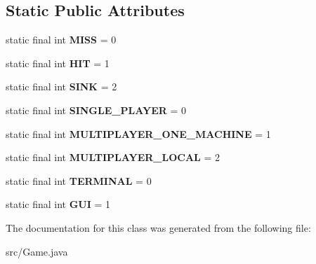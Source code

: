 \subsection*{Static Public Attributes}
\begin{DoxyCompactItemize}
\item 
static final int {\bfseries M\+I\+SS} = 0\hypertarget{classGame_a66375c0a8f7f1a1480bd47221bc31917}{}\label{classGame_a66375c0a8f7f1a1480bd47221bc31917}

\item 
static final int {\bfseries H\+IT} = 1\hypertarget{classGame_a3840c1d15fa897a006516377a7f2e340}{}\label{classGame_a3840c1d15fa897a006516377a7f2e340}

\item 
static final int {\bfseries S\+I\+NK} = 2\hypertarget{classGame_a025eaf2e2b3235687cebe23b45f74467}{}\label{classGame_a025eaf2e2b3235687cebe23b45f74467}

\item 
static final int {\bfseries S\+I\+N\+G\+L\+E\+\_\+\+P\+L\+A\+Y\+ER} = 0\hypertarget{classGame_a5339842157512627a57fd244ddf6fee1}{}\label{classGame_a5339842157512627a57fd244ddf6fee1}

\item 
static final int {\bfseries M\+U\+L\+T\+I\+P\+L\+A\+Y\+E\+R\+\_\+\+O\+N\+E\+\_\+\+M\+A\+C\+H\+I\+NE} = 1\hypertarget{classGame_a154eba714e497a72538c02a4a242e6f0}{}\label{classGame_a154eba714e497a72538c02a4a242e6f0}

\item 
static final int {\bfseries M\+U\+L\+T\+I\+P\+L\+A\+Y\+E\+R\+\_\+\+L\+O\+C\+AL} = 2\hypertarget{classGame_a33173902f263a3da1fcc20039c5270c4}{}\label{classGame_a33173902f263a3da1fcc20039c5270c4}

\item 
static final int {\bfseries T\+E\+R\+M\+I\+N\+AL} = 0\hypertarget{classGame_a5b128fb3114228cd96da20f04a242ece}{}\label{classGame_a5b128fb3114228cd96da20f04a242ece}

\item 
static final int {\bfseries G\+UI} = 1\hypertarget{classGame_a9946b16728ee007ef31ec57e6578d2a2}{}\label{classGame_a9946b16728ee007ef31ec57e6578d2a2}

\end{DoxyCompactItemize}


The documentation for this class was generated from the following file\+:\begin{DoxyCompactItemize}
\item 
src/Game.\+java\end{DoxyCompactItemize}
